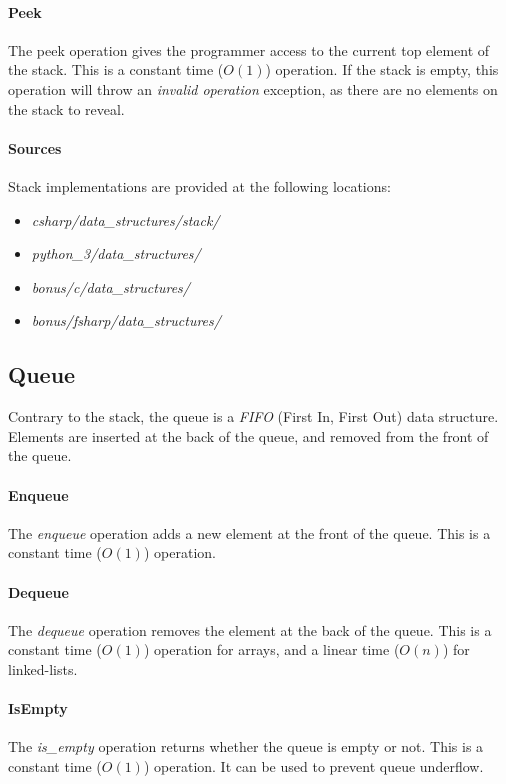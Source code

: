 \documentclass{article}
\begin{document}
\paragraph{Peek}
The peek operation gives the programmer access to the current top element of the stack.
This is a constant time (\(O(1)\)) operation. If the stack is empty, this operation will throw an
{\em invalid operation} exception, as there are no elements on the stack to reveal.

\paragraph{Sources}
Stack implementations are provided at the following locations:
\begin{itemize}
\item{{\em csharp/data\_structures/stack/}}
\item{{\em python\_3/data\_structures/}}
\item{{\em bonus/c/data\_structures/}}
\item{{\em bonus/fsharp/data\_structures/}}
\end{itemize}


\newpage


\subsection{Queue}
Contrary to the stack, the queue is a {\em FIFO} (First In, First Out) data structure.
Elements are inserted at the back of the queue, and removed from the front of the queue.

\paragraph{Enqueue}
The {\em enqueue} operation adds a new element at the front of the queue.
This is a constant time (\(O(1)\)) operation.

\paragraph{Dequeue}
The {\em dequeue} operation removes the element at the back of the queue.
This is a constant time (\(O(1)\)) operation for arrays, and a linear time (\(O(n)\)) for linked-lists.

\paragraph{IsEmpty}
The {\em is\_empty} operation returns whether the queue is empty or not.
This is a constant time (\(O(1)\)) operation. It can be used to prevent queue underflow.
\end{document}
